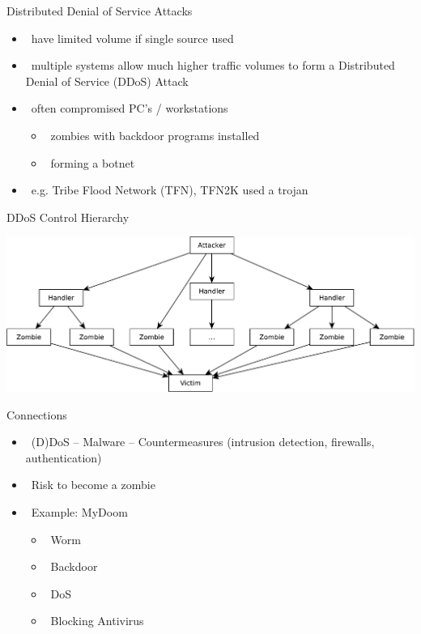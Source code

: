 \documentclass{beamer}
\begin{document}
\begin{frame}{Distributed Denial of Service Attacks }
  \begin{itemize}
  \item  have limited volume if single source used 
  \item  multiple systems allow much higher traffic 
    volumes to form a Distributed Denial of 
    Service (DDoS) Attack 
  \item  often compromised PC’s / workstations 
    \begin{itemize}
    \item  zombies with backdoor programs installed 
    \item  forming a botnet 
    \end{itemize}
  \item  e.g. Tribe Flood Network (TFN), TFN2K used a 
    trojan
  \end{itemize}
\end{frame}



\begin{frame}{DDoS Control Hierarchy}
  \begin{center}
    \includegraphics[width=1\linewidth]{ddos}
  \end{center}
\end{frame}

\begin{frame}{Connections}
  \begin{itemize}
  \item  (D)DoS – Malware – Countermeasures 
    (intrusion detection, firewalls, authentication) 
  \item  Risk to become a zombie 
  \item  Example: MyDoom 
    \begin{itemize}
    \item  Worm 
    \item  Backdoor 
    \item  DoS 
    \item  Blocking Antivirus
    \end{itemize}
  \end{itemize}
\end{frame}
\end{document}
